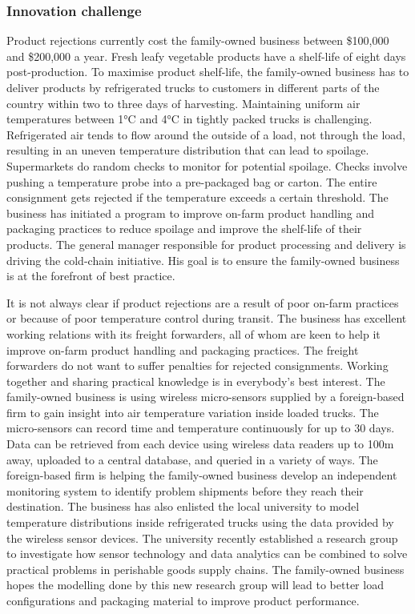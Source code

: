 \subsubsection{Innovation challenge}

Product rejections currently cost the family-owned business between \$100,000 and \$200,000 a year. Fresh leafy vegetable products have a shelf-life of eight days post-production. To maximise product shelf-life, the family-owned business has to deliver products by refrigerated trucks to customers in different parts of the country within two to three days of harvesting. Maintaining uniform air temperatures between 1\si{\degree}C and 4\si{\degree}C in tightly packed trucks is challenging. Refrigerated air tends to flow around the outside of a load, not through the load, resulting in an uneven temperature distribution that can lead to spoilage. Supermarkets do random checks to monitor for potential spoilage. Checks involve pushing a temperature probe into a pre-packaged bag or carton. The entire consignment gets rejected if the temperature exceeds a certain threshold. The business has initiated a program to improve on-farm product handling and packaging practices to reduce spoilage and improve the shelf-life of their products. The general manager responsible for product processing and delivery is driving the cold-chain initiative. His goal is to ensure the family-owned business is at the forefront of best practice. \medskip

It is not always clear if product rejections are a result of poor on-farm practices or because of poor temperature control during transit. The business has excellent working relations with its freight forwarders, all of whom are keen to help it improve on-farm product handling and packaging practices. The freight forwarders do not want to suffer penalties for rejected consignments. Working together and sharing practical knowledge is in everybody's best interest. The family-owned business is using wireless micro-sensors supplied by a foreign-based firm to gain insight into air temperature variation inside loaded trucks. The micro-sensors can record time and temperature continuously for up to 30 days. Data can be retrieved from each device using wireless data readers up to 100m away, uploaded to a central database, and queried in a variety of ways. The foreign-based firm is helping the family-owned business develop an independent monitoring system to identify problem shipments before they reach their destination. The business has also enlisted the local university to model temperature distributions inside refrigerated trucks using the data provided by the wireless sensor devices. The university recently established a research group to investigate how sensor technology and data analytics can be combined to solve practical problems in perishable goods supply chains. The family-owned business hopes the modelling done by this new research group will lead to better load configurations and packaging material to improve product performance. \medskip

